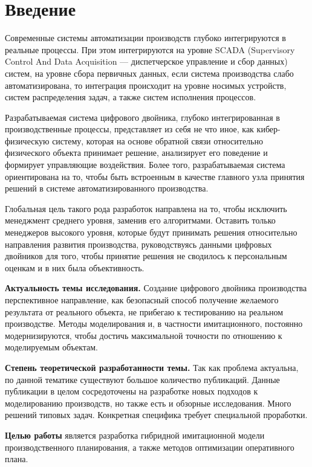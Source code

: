 \section*{Введение}
Современные системы автоматизации производств глубоко интегрируются в реальные процессы. При этом интегрируются на уровне SCADA (Supervisory Control And Data Acquisition — диспетчерское управление и сбор данных) систем, на уровне сбора первичных данных, если система производства слабо автоматизирована, то интеграция происходит на уровне носимых устройств, систем распределения задач, а также систем исполнения процессов.

Разрабатываемая система цифрового двойника, глубоко интегрированная в производственные процессы, представляет из себя не что иное, как кибер-физическую систему, которая на основе обратной связи относительно физического объекта принимает решение, анализирует его поведение и формирует управляющие воздействия. Более того, разрабатываемая система ориентирована на то, чтобы быть встроенным в качестве главного узла принятия решений в системе автоматизированного производства.

Глобальная цель такого рода разработок направлена на то, чтобы исключить менеджмент среднего уровня, заменив его алгоритмами. Оставить только менеджеров высокого уровня, которые будут принимать решения относительно направления развития производства, руководствуясь данными цифровых двойников для того, чтобы принятие решения не сводилось к персональным оценкам и в них была объективность.


\newpage

\textbf{Актуальность темы исследования.} Создание цифрового двойника производства перспективное направление, как безопасный способ получение желаемого результата от реального объекта, не прибегаю к тестированию на реальном производстве. Методы моделирования и, в частности имитационного, постоянно модернизируются, чтобы достичь максимальной точности по отношению к моделируемым объектам.

\textbf{Степень теоретической разработанности темы.} Так как проблема актуальна, по данной тематике существуют большое количество публикаций. Данные публикации в целом сосредоточены на разработке новых подходов к моделированию производств, но также есть и обзорные исследования. Много решений типовых задач. Конкретная специфика требует специальной проработки.

\textbf{Целью работы} является разработка гибридной имитационной модели производственного планирования, а также методов оптимизации оперативного плана.

